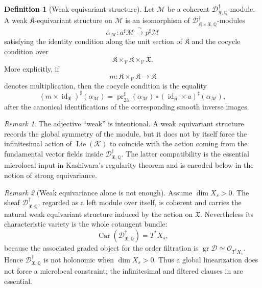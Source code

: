 \documentclass[11pt]{amsart}
\theoremstyle{plain}
\theoremstyle{definition}
\newtheorem{definition}{Definition}[section]
\theoremstyle{remark}
\newtheorem{remark}{Remark}[section]
\newcommand{\X}{\mathfrak X}
\newcommand{\DdagX}{\mathscr D^{\dagger}_{\X,\mathbb Q}}
\newcommand{\Car}{\operatorname{Car}}
\begin{document}
\begin{definition}[Weak equivariant structure]
\label{def:weak-equivariant-structure}
Let \(\mathcal M\) be a coherent
\(\mathscr D^\dagger_{\mathfrak X,\mathbb Q}\)-module. A weak
\(\mathfrak K\)-equivariant structure on \(\mathcal M\) is an isomorphism of
\(\mathscr D^\dagger_{\mathfrak K\times\mathfrak X,\mathbb Q}\)-modules
\[
  \alpha_{\mathcal M}:a^\sharp\mathcal M
  \xrightarrow{\;\sim\;}
  p^\sharp\mathcal M
\]
satisfying the identity condition along the unit section of \(\mathfrak K\)
and the cocycle condition over
\[
  \mathfrak K\times_{\mathcal V}\mathfrak K\times_{\mathcal V}\mathfrak X.
\]
More explicitly, if
\[
  m:\mathfrak K\times_{\mathcal V}\mathfrak K\longrightarrow \mathfrak K
\]
denotes multiplication, then the cocycle condition is the equality
\[
  (m\times\operatorname{id}_{\mathfrak X})^\sharp(\alpha_{\mathcal M})
  =
  \operatorname{pr}_{23}^{\sharp}(\alpha_{\mathcal M})
  \circ
  (\operatorname{id}_{\mathfrak K}\times a)^\sharp(\alpha_{\mathcal M}),
\]
after the canonical identifications of the corresponding smooth inverse images.
\end{definition}

\begin{remark}
\label{rem:weak-versus-strong}
The adjective ``weak'' is intentional. A weak equivariant structure records the
global symmetry of the module, but it does not by itself force the
infinitesimal action of \(\operatorname{Lie}(\mathcal K)\) to coincide with the
action coming from the fundamental vector fields inside
\(\mathscr D^\dagger_{\mathfrak X,\mathbb Q}\). The latter compatibility is the
essential microlocal input in Kashiwara's regularity theorem and is encoded
below in the notion of strong equivariance.
\end{remark}

\begin{remark}[Weak equivariance alone is not enough]
\label{rem:weak-equivariance-not-holonomic}
Assume \(\dim X_s>0\).  The sheaf
\(\DdagX\), regarded as a left module over itself, is coherent and carries the
natural weak equivariant structure induced by the action on
\(\mathfrak X\).  Nevertheless its characteristic variety is the whole
cotangent bundle:
\[
  \Car(\DdagX)=T^*X_s,
\]
because the associated graded object for the order filtration is
\(\operatorname{gr}\mathscr D\simeq\mathcal O_{T^*X_s}\).  Hence
\(\DdagX\) is not holonomic when \(\dim X_s>0\).  Thus a global
linearization does not force a microlocal constraint; the infinitesimal and
filtered clauses in  are essential.
\end{remark}
\end{document}
